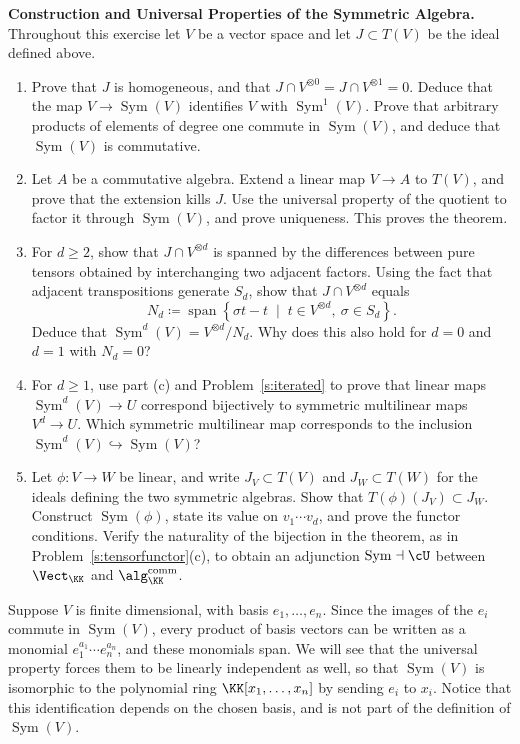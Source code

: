 \documentclass[12pt,reqno]{amsart}
\DeclareMathOperator{\Sym}{Sym}
\begin{document}
\begin{problems}
\item\label{s:symmetric} \textbf{Construction and Universal Properties of the Symmetric Algebra.} Throughout this exercise let $V$ be a vector space and let $J\subset T(V)$ be the ideal defined above.
\begin{enumerate}
\item Prove that $J$ is homogeneous, and that $J\cap V^{\otimes0}=J\cap V^{\otimes1}=0$. Deduce that the map $V\to\Sym(V)$ identifies $V$ with $\Sym^1(V)$. Prove that arbitrary products of elements of degree one commute in $\Sym(V)$, and deduce that $\Sym(V)$ is commutative.
\item Let $A$ be a commutative algebra. Extend a linear map $V\to A$ to $T(V)$, and prove that the extension kills $J$. Use the universal property of the quotient to factor it through $\Sym(V)$, and prove uniqueness. This proves the theorem.
\item For $d\geq2$, show that $J\cap V^{\otimes d}$ is spanned by the differences between pure tensors obtained by interchanging two adjacent factors. Using the fact that adjacent transpositions generate $S_d$, show that $J\cap V^{\otimes d}$ equals
\[
N_d\coloneqq\operatorname{span}\left\{\sigma t-t \;\; \big| \;\; t\in V^{\otimes d},\ \sigma\in S_d\right\}.
\]
Deduce that $\Sym^d(V)=V^{\otimes d}/N_d$. Why does this also hold for $d=0$ and $d=1$ with $N_d=0$?
\item For $d\geq1$, use part (c) and Problem~\ref{s:iterated} to prove that linear maps $\Sym^d(V)\to U$ correspond bijectively to symmetric multilinear maps $V^d\to U$. Which symmetric multilinear map corresponds to the inclusion $\Sym^d(V)\hookrightarrow\Sym(V)$?
\item Let $\phi:V\to W$ be linear, and write $J_V\subset T(V)$ and $J_W\subset T(W)$ for the ideals defining the two symmetric algebras. Show that $T(\phi)(J_V)\subset J_W$. Construct $\Sym(\phi)$, state its value on $v_1\cdots v_d$, and prove the functor conditions. Verify the naturality of the bijection in the theorem, as in Problem~\ref{s:tensorfunctor}(c), to obtain an adjunction $\Sym\dashv\cU$ between $\Vect_{\KK}$ and $\alg_{\KK}^{\mathrm{comm}}$.
\end{enumerate}
\end{problems}

\hrulefill

Suppose $V$ is finite dimensional, with basis $e_1,\ldots,e_n$. Since the images of the $e_i$ commute in $\Sym(V)$, every product of basis vectors can be written as a monomial $e_1^{a_1}\cdots e_n^{a_n}$, and these monomials span. We will see that the universal property forces them to be linearly independent as well, so that $\Sym(V)$ is isomorphic to the polynomial ring $\KK[x_1,\ldots,x_n]$ by sending $e_i$ to $x_i$. Notice that this identification depends on the chosen basis, and is not part of the definition of $\Sym(V)$.
\end{document}
